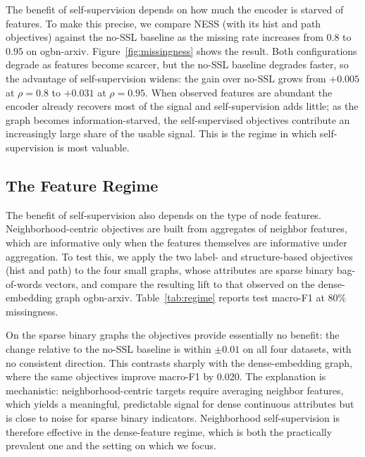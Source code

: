 The benefit of self-supervision depends on how much the encoder is starved of features. To make this precise, we compare NESS (with its hist and path objectives) against the no-SSL baseline as the missing rate increases from $0.8$ to $0.95$ on ogbn-arxiv. Figure~\ref{fig:missingness} shows the result. Both configurations degrade as features become scarcer, but the no-SSL baseline degrades faster, so the advantage of self-supervision widens: the gain over no-SSL grows from $+0.005$ at $\rho=0.8$ to $+0.031$ at $\rho=0.95$. When observed features are abundant the encoder already recovers most of the signal and self-supervision adds little; as the graph becomes information-starved, the self-supervised objectives contribute an increasingly large share of the usable signal. This is the regime in which self-supervision is most valuable.




\subsection{The Feature Regime}
\label{sec:exp-regime}

The benefit of self-supervision also depends on the type of node features. Neighborhood-centric objectives are built from aggregates of neighbor features, which are informative only when the features themselves are informative under aggregation. To test this, we apply the two label- and structure-based objectives (hist and path) to the four small graphs, whose attributes are sparse binary bag-of-words vectors, and compare the resulting lift to that observed on the dense-embedding graph ogbn-arxiv. Table~\ref{tab:regime} reports test macro-F1 at $80\%$ missingness.

On the sparse binary graphs the objectives provide essentially no benefit: the change relative to the no-SSL baseline is within $\pm 0.01$ on all four datasets, with no consistent direction. This contrasts sharply with the dense-embedding graph, where the same objectives improve macro-F1 by $0.020$. The explanation is mechanistic: neighborhood-centric targets require averaging neighbor features, which yields a meaningful, predictable signal for dense continuous attributes but is close to noise for sparse binary indicators. Neighborhood self-supervision is therefore effective in the dense-feature regime, which is both the practically prevalent one and the setting on which we focus.

